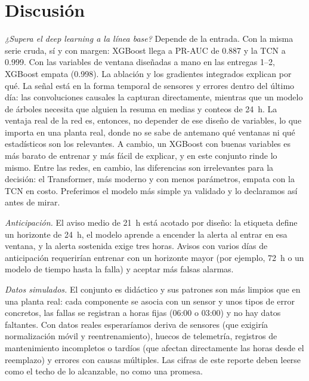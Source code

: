 \documentclass[conference,letterpaper]{IEEEtran}
\begin{document}
\section{Discusión}\label{sec:disc}
\textit{¿Supera el deep learning a la línea base?} Depende de la entrada. Con la misma serie cruda, sí y con margen: XGBoost llega a PR-AUC de 0.887 y la TCN a 0.999. Con las variables de ventana diseñadas a mano en las entregas 1--2, XGBoost empata (0.998). La ablación y los gradientes integrados explican por qué. La señal está en la forma temporal de sensores y errores dentro del último día: las convoluciones causales la capturan directamente, mientras que un modelo de árboles necesita que alguien la resuma en medias y conteos de 24~h. La ventaja real de la red es, entonces, no depender de ese diseño de variables, lo que importa en una planta real, donde no se sabe de antemano qué ventanas ni qué estadísticos son los relevantes. A cambio, un XGBoost con buenas variables es más barato de entrenar y más fácil de explicar, y en este conjunto rinde lo mismo. Entre las redes, en cambio, las diferencias son irrelevantes para la decisión: el Transformer, más moderno y con menos parámetros, empata con la TCN en costo. Preferimos el modelo más simple ya validado y lo declaramos así antes de mirar.

\textit{Anticipación.} El aviso medio de 21~h está acotado por diseño: la etiqueta define un horizonte de 24~h, el modelo aprende a encender la alerta al entrar en esa ventana, y la alerta sostenida exige tres horas. Avisos con varios días de anticipación requerirían entrenar con un horizonte mayor (por ejemplo, 72~h o un modelo de tiempo hasta la falla) y aceptar más falsas alarmas.

\textit{Datos simulados.} El conjunto es didáctico y sus patrones son más limpios que en una planta real: cada componente se asocia con un sensor y unos tipos de error concretos, las fallas se registran a horas fijas (06:00 o 03:00) y no hay datos faltantes. Con datos reales esperaríamos deriva de sensores (que exigiría normalización móvil y reentrenamiento), huecos de telemetría, registros de mantenimiento incompletos o tardíos (que afectan directamente las horas desde el reemplazo) y errores con causas múltiples. Las cifras de este reporte deben leerse como el techo de lo alcanzable, no como una promesa.
\end{document}
